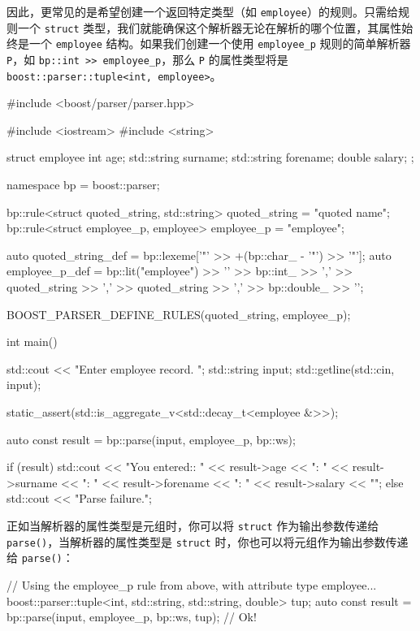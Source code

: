 因此，更常见的是希望创建一个返回特定类型（如 \texttt{employee}）的规则。只需给规则一个 \texttt{struct} 类型，我们就能确保这个解析器无论在解析的哪个位置，其属性始终是一个 \texttt{employee} 结构。如果我们创建一个使用 \texttt{employee\_p} 规则的简单解析器 \texttt{P}，如 \texttt{bp::int >> employee\_p}，那么 \texttt{P} 的属性类型将是 \texttt{boost::parser::tuple<int, employee>}。

\begin{code}
#include <boost/parser/parser.hpp>

#include <iostream>
#include <string>


struct employee
{
    int age;
    std::string surname;
    std::string forename;
    double salary;
};

namespace bp = boost::parser;

bp::rule<struct quoted_string, std::string> quoted_string = "quoted name";
bp::rule<struct employee_p, employee> employee_p = "employee";

auto quoted_string_def = bp::lexeme['"' >> +(bp::char_ - '"') >> '"'];
auto employee_p_def = bp::lit("employee")
    >> '{'
    >> bp::int_ >> ','
    >> quoted_string >> ','
    >> quoted_string >> ','
    >> bp::double_
    >> '}';

BOOST_PARSER_DEFINE_RULES(quoted_string, employee_p);

int main()
{
    std::cout << "Enter employee record. ";
    std::string input;
    std::getline(std::cin, input);

    static_assert(std::is_aggregate_v<std::decay_t<employee &>>);

    auto const result = bp::parse(input, employee_p, bp::ws);

    if (result) {
        std::cout << "You entered:\nage:      " << result->age
                  << "\nsurname:  " << result->surname
                  << "\nforename: " << result->forename
                  << "\nsalary  : " << result->salary << "\n";
    } else {
        std::cout << "Parse failure.\n";
    }
}
\end{code}

正如当解析器的属性类型是元组时，你可以将 \texttt{struct} 作为输出参数传递给 \texttt{parse()}，当解析器的属性类型是 \texttt{struct} 时，你也可以将元组作为输出参数传递给 \texttt{parse()}：

\begin{code}
// Using the employee_p rule from above, with attribute type employee...
boost::parser::tuple<int, std::string, std::string, double> tup;
auto const result = bp::parse(input, employee_p, bp::ws, tup); // Ok!
\end{code}


